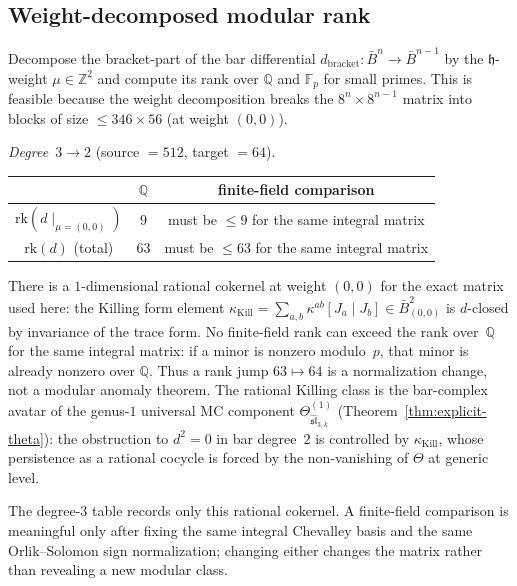 \subsection{Weight-decomposed modular rank}

\begin{computation}
\label{comp:sl3-modular-rank}

Decompose the bracket-part of the bar differential
$d_{\mathrm{bracket}}\colon \bar{B}^n \to \bar{B}^{n-1}$
by the $\mathfrak{h}$-weight $\mu \in \mathbb{Z}^2$ and
compute its rank over $\mathbb{Q}$ and $\mathbb{F}_p$ for
small primes. This is feasible because the weight decomposition
breaks the $8^n \times 8^{n-1}$ matrix into blocks of size
$\leq 346 \times 56$ (at weight $(0,0)$).

\emph{Degree~$3 \to 2$} (source $= 512$, target $= 64$).
\begin{center}
\renewcommand{\arraystretch}{1.2}
\begin{tabular}{c|cc}
& $\mathbb{Q}$ & finite-field comparison \\
\hline
$\mathrm{rk}(d \mid_{\mu=(0,0)})$ & $9$ &
must be $\leq 9$ for the same integral matrix \\
$\mathrm{rk}(d)$ (total) & $63$ &
must be $\leq 63$ for the same integral matrix
\end{tabular}
\end{center}
There is a $1$-dimensional rational cokernel at weight
$(0,0)$ for the exact matrix used here: the Killing form element
$\kappa_{\mathrm{Kill}} =
\sum_{a,b} \kappa^{ab} [J_a \mid J_b] \in \bar{B}^2_{(0,0)}$
is $d$-closed by invariance of the trace form. No finite-field rank
can exceed the rank over~$\mathbb{Q}$ for the same integral matrix:
if a minor is nonzero modulo~$p$, that minor is already nonzero over
$\mathbb{Q}$. Thus a rank jump $63\mapsto64$ is a normalization
change, not a modular anomaly theorem. The rational Killing class is the
bar-complex avatar of the genus-$1$ universal MC component
$\Theta^{(1)}_{\widehat{\mathfrak{sl}}_{3,k}}$
(Theorem~\ref{thm:explicit-theta}): the obstruction to
$d^2 = 0$ in bar degree~$2$ is controlled by $\kappa_{\mathrm{Kill}}$,
whose persistence as a rational cocycle is forced by the
non-vanishing of $\Theta$ at generic level.

The degree-$3$ table records only this rational cokernel. A finite-field
comparison is meaningful only after fixing the same integral
Chevalley basis and the same Orlik--Solomon sign normalization; changing
either changes the matrix rather than revealing a new modular class.


\end{computation}
